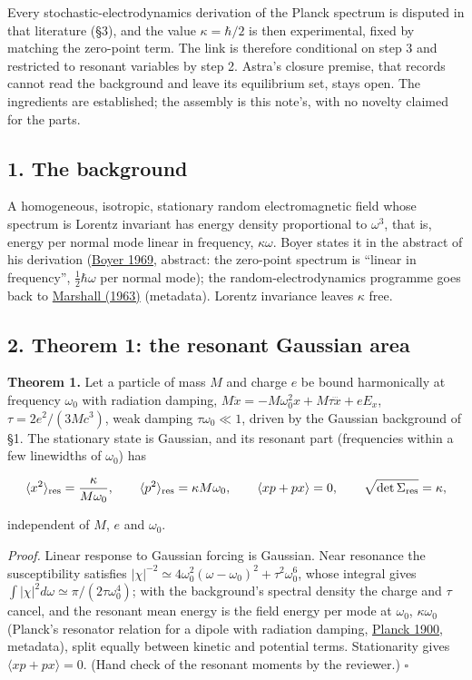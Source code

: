 \documentclass[11pt,a4paper]{article}
\begin{document}
Every stochastic-electrodynamics derivation of the Planck spectrum is
disputed in that literature (§3), and the value \(\kappa=\hbar/2\) is
then experimental, fixed by matching the zero-point term. The link is
therefore conditional on step 3 and restricted to resonant variables by
step 2. Astra's closure premise, that records cannot read the background
and leave its equilibrium set, stays open. The ingredients are
established; the assembly is this note's, with no novelty claimed for
the parts.

\hypertarget{the-background}{%
\subsection{1. The background}\label{the-background}}

A homogeneous, isotropic, stationary random electromagnetic field whose
spectrum is Lorentz invariant has energy density proportional to
\(\omega^3\), that is, energy per normal mode linear in frequency,
\(\kappa\omega\). Boyer states it in the abstract of his derivation
(\href{https://doi.org/10.1103/PhysRev.182.1374}{Boyer 1969}, abstract:
the zero-point spectrum is ``linear in frequency'',
\(\frac12\hbar\omega\) per normal mode); the random-electrodynamics
programme goes back to
\href{https://doi.org/10.1098/rspa.1963.0220}{Marshall (1963)}
(metadata). Lorentz invariance leaves \(\kappa\) free.

\hypertarget{theorem-1-the-resonant-gaussian-area}{%
\subsection{2. Theorem 1: the resonant Gaussian
area}\label{theorem-1-the-resonant-gaussian-area}}

\textbf{Theorem 1.} Let a particle of mass \(M\) and charge \(e\) be
bound harmonically at frequency \(\omega_0\) with radiation damping,
\(M\ddot x=-M\omega_0^2x+M\tau\dddot x+eE_x\), \(\tau=2e^2/(3Mc^3)\),
weak damping \(\tau\omega_0\ll1\), driven by the Gaussian background of
§1. The stationary state is Gaussian, and its resonant part (frequencies
within a few linewidths of \(\omega_0\)) has

\[\langle x^2\rangle_{\rm res}=\frac\kappa{M\omega_0},\qquad
\langle p^2\rangle_{\rm res}=\kappa M\omega_0,\qquad
\langle xp+px\rangle=0,\qquad\sqrt{\det\Sigma_{\rm res}}=\kappa,\]

independent of \(M\), \(e\) and \(\omega_0\).

\emph{Proof.} Linear response to Gaussian forcing is Gaussian. Near
resonance the susceptibility satisfies
\(|\chi|^{-2}\simeq4\omega_0^2(\omega-\omega_0)^2+\tau^2\omega_0^6\),
whose integral gives \(\int|\chi|^2d\omega\simeq\pi/(2\tau\omega_0^4)\);
with the background's spectral density the charge and \(\tau\) cancel,
and the resonant mean energy is the field energy per mode at
\(\omega_0\), \(\kappa\omega_0\) (Planck's resonator relation for a
dipole with radiation damping,
\href{https://doi.org/10.1002/andp.19003060105}{Planck 1900}, metadata),
split equally between kinetic and potential terms. Stationarity gives
\(\langle xp+px\rangle=0\). (Hand check of the resonant moments by the
reviewer.) \(\square\)
\end{document}
